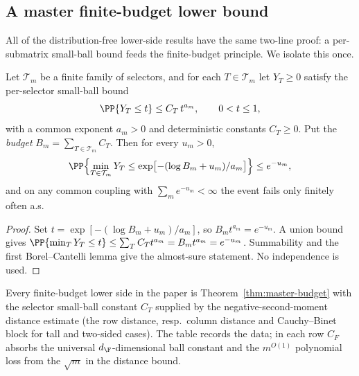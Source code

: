 
\subsection*{A master finite-budget lower bound}

All of the distribution-free lower-side results have the same two-line proof: a per-submatrix
small-ball bound feeds the finite-budget principle.  We isolate this once.

\begin{theorem}\label{thm:master-budget}
Let $\mathcal T_m$ be a finite family of selectors, and for each $T\in\mathcal T_m$ let $Y_T\ge0$
satisfy the per-selector small-ball bound
\[
  \PP\{Y_T\le t\}\le C_T\,t^{a_m},\qquad 0<t\le1,
\]
with a common exponent $a_m>0$ and deterministic constants $C_T\ge0$.  Put the
\emph{budget} $B_m=\sum_{T\in\mathcal T_m}C_T$.  Then for every $u_m>0$,
\[
  \PP\Bigl\{\min_{T\in\mathcal T_m}Y_T\le \exp\bigl[-(\log B_m+u_m)/a_m\bigr]\Bigr\}\le e^{-u_m},
\]
and on any common coupling with $\sum_m e^{-u_m}<\infty$ the event fails only finitely often a.s.
\end{theorem}

\begin{proof}
Set $t=\exp[-(\log B_m+u_m)/a_m]$, so $B_m t^{a_m}=e^{-u_m}$.  A union bound gives
$\PP\{\min_T Y_T\le t\}\le\sum_T C_T t^{a_m}=B_m t^{a_m}=e^{-u_m}$.  Summability and the first
Borel--Cantelli lemma give the almost-sure statement.  No independence is used.
\end{proof}

Every finite-budget lower side in the paper is Theorem~\ref{thm:master-budget} with the selector
small-ball constant $C_T$ supplied by the negative-second-moment distance estimate (the row
distance, resp.\ column distance and Cauchy--Binet block for tall and two-sided cases).  The
table records the data; in each row $C_F$ absorbs the universal $d_\F$-dimensional ball constant
and the $m^{O(1)}$ polynomial loss from the $\sqrt m$ in the distance bound.

